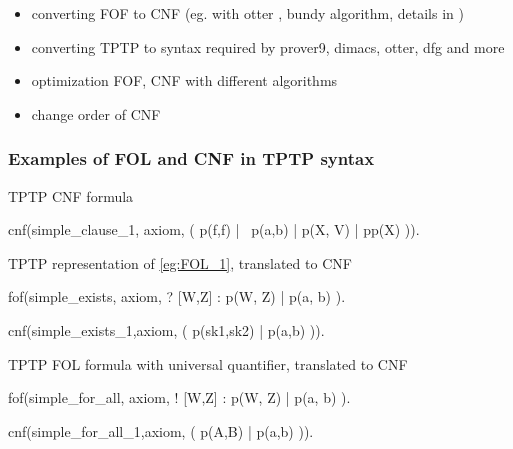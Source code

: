 \begin{itemize}
  \item converting \gls{FOF} to \gls{CNF} (eg. with otter \cite{McC-Otter-URL}, bundy \cite{Bun83} algorithm, details in \cite{SM96})
  \item converting TPTP to syntax required by prover9, dimacs, otter, dfg and more
  \item optimization \gls{FOF}, \gls{CNF} with different algorithms
  \item change order of \gls{CNF}
\end{itemize}

\subsubsection{Examples of FOL and CNF in TPTP syntax}

\begin{listing}[H]
  \caption{TPTP CNF formula}
\begin{tptpcode}
cnf(simple_clause_1, axiom,
    ( p(f,f) | ~p(a,b) | p(X, V) | pp(X) )).

\end{tptpcode}
\end{listing}

\begin{listing}[H]
  \caption{TPTP representation of \ref{eg:FOL_1}, translated to CNF}
\begin{tptpcode}
fof(simple_exists, axiom,
 ? [W,Z] :  p(W, Z) | p(a, b)
  ).

cnf(simple_exists_1,axiom,
    ( p(sk1,sk2) | p(a,b) )).
\end{tptpcode}
\end{listing}

\begin{listing}[H]
  \caption{TPTP FOL formula with universal quantifier, translated to CNF}
\begin{tptpcode}
fof(simple_for_all, axiom,
 ! [W,Z] :  p(W, Z) | p(a, b)
  ).

cnf(simple_for_all_1,axiom,
    ( p(A,B) | p(a,b) )).
\end{tptpcode}
\end{listing}

